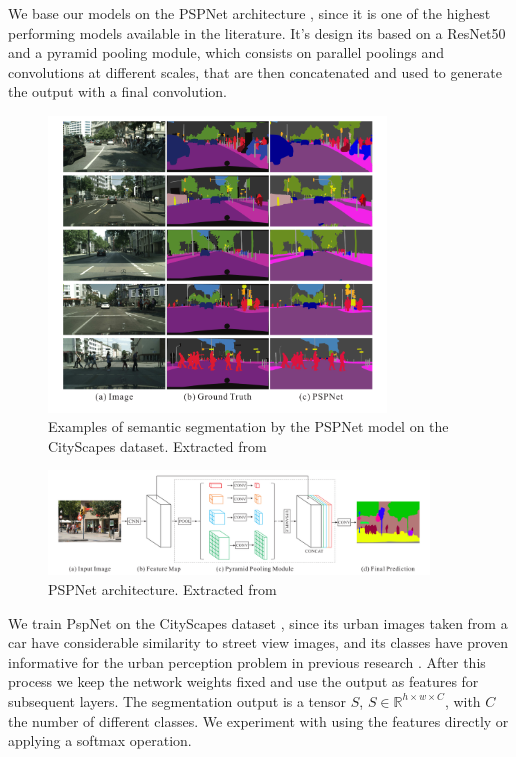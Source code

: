 We base our models on the PSPNet architecture \cite{pspnet}, since it is one of the highest performing models
available in the literature. It's design its based on a ResNet50 and a pyramid pooling module, which consists on
parallel poolings and convolutions at different scales, that are then concatenated and used to generate the output with a
final convolution.

\begin{figure}[ht]
	\begin{center}
	\includegraphics[width=0.8\textwidth]{./figures/segmentation.png}
	\caption[Example of Semantic Segmentation]{Examples of semantic segmentation by the PSPNet model on the CityScapes dataset. Extracted from  }
	\label{fig:segmentation}
	\end{center}
\end{figure}

\begin{figure}[ht]
	\begin{center}
	\includegraphics[width=0.9\textwidth]{./figures/pspnet.png}
	\caption[PspNet architecture]{PSPNet architecture. Extracted from  }
	\label{fig:segmentation}
	\end{center}
\end{figure}

We train PspNet on the CityScapes dataset \cite{cordts_cityscapes}, since its urban images taken from a car have
considerable similarity to street view images, and its classes have proven informative for the urban perception problem
in previous research \cite{rossetti,zhang_measuring}. After this process we keep the network weights fixed
and use the output as features for subsequent layers. The segmentation output  is a tensor $S$, $S \in \mathbb{R}^{h\times w \times C}$, with $C$
the number of different classes. We experiment with using the features directly or applying a softmax operation.

